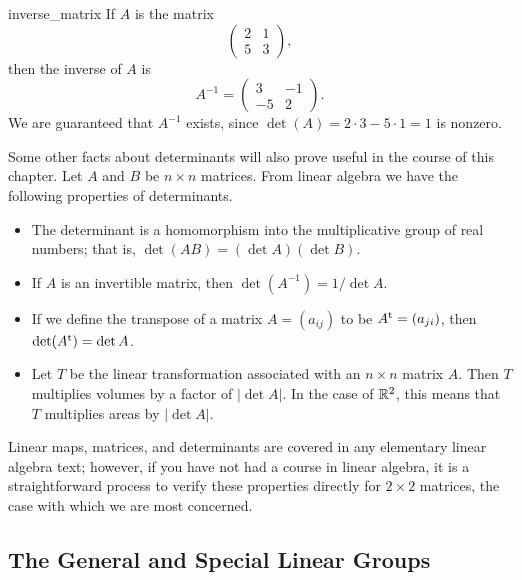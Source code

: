  
\begin{example}{inverse_matrix}
If $A$ is the matrix
\[
\left(
\begin{array}{cc}
2 & 1 \\
5 & 3
\end{array}
\right),
\]
then the inverse of $A$ is
\[
A^{-1} =
\left(
\begin{array}{cc}
3 & -1 \\
-5 & 2
\end{array}
\right).
\]
We are guaranteed  that $A^{-1}$ exists, since $\det(A) = 2 \cdot 3 - 5
\cdot 1 = 1$ is nonzero. \mbox{\hspace*{1in}}
\end{example}
 
 
Some other facts about determinants will also prove useful in the
course of this chapter.   Let $A$ and $B$ be $n \times n$ matrices.
From linear algebra we have the following properties of determinants.
\begin{itemize}
 
\item
The determinant is a homomorphism into the multiplicative group of
real numbers; that is, $\det( A B) = (\det A )(\det B)$. 
 
\item
If $A$ is an invertible matrix, then $\det(A^{-1}) = 1 / \det A$.
 
\item
If we define the transpose  of a matrix $A = (a_{ij})$ to be $A^{\rm
t} = (a_{ji})$, then $\det(A^{\rm t}) = \det A$. 
 
\item
Let $T$ be the linear transformation associated with an $n \times n$
matrix $A$. Then $T$ multiplies volumes by a factor of $|\det A|$. In
the case of ${\Bbb R}^2$, this means that $T$ multiplies areas by
$|\det A|$.
 
\end{itemize}
 
 
Linear maps, matrices, and determinants are covered in any elementary
linear algebra text; however, if you have not had a course in linear
algebra, it is a straightforward process to verify these properties
directly for $2 \times 2$ matrices, the case with which we are most
concerned. 
 
 
 
\subsection*{The General and Special Linear Groups}
 
